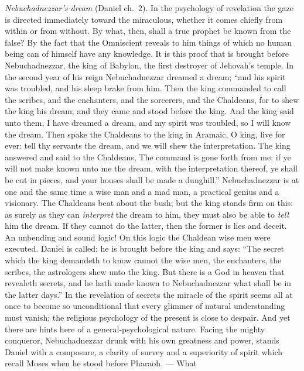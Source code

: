 \documentclass[12pt,a4paper,openany]{book}
\newcommand{\opage}[1]{\marginnote{\footnotesize\textit{[#1]}}}
\begin{document}
\emph{Nebuchadnezzar's dream} (Daniel ch.~2). In the psychology of revelation
the gaze is directed immediately toward
the miraculous, whether it comes chiefly from within
or from without. By what, then, shall a true prophet be
known from the false? By the fact that the
Omniscient reveals to him things of which no human being
can of himself have any knowledge. It is this proof
that is brought before Nebuchadnezzar, the king of Babylon,
the first destroyer of Jehovah's temple. In the second year of his reign
Nebuchadnezzar dreamed a dream; ``and his spirit
\setcounter{footnote}{0}%
\opage{42}was troubled, and his sleep brake from him. Then the king
commanded to call the scribes, and the enchanters, and
the sorcerers, and the Chaldeans, for to shew the king
his dream; and they came and stood before the king.
And the king said unto them, I have dreamed a dream, and
my spirit was troubled, so I will know the dream. Then spake the Chaldeans
to the king in Aramaic, O king, live
for ever: tell thy servants the dream, and we will shew
the interpretation. The king answered and said to the Chaldeans,
The command is gone forth from me: if ye will not
make known unto me the dream, with the interpretation thereof, ye
shall be cut in pieces, and your houses shall be made a
dunghill.'' Nebuchadnezzar is at one and the same time a wise
man and a mad man, a practical genius and a visionary.
The Chaldeans beat about the bush; but the king stands
firm on this: as surely as they can \emph{interpret} the dream to him,
they must also be able to \emph{tell} him the dream. If they cannot
do the latter, then the former is lies and deceit.
An unbending and sound logic! On this logic
the Chaldean wise men were executed. Daniel
is called; he is brought before the king and says: ``The secret
which the king demandeth to know cannot the wise men,
the enchanters, the scribes, the astrologers shew
unto the king. But there is a God in heaven that
revealeth secrets, and he hath made known to
Nebuchadnezzar what shall be in the latter days.'' In the
revelation of secrets the miracle of the spirit seems
all at once to become so unconditional that every glimmer of
natural understanding must vanish; the religious psychology of the present
is close to despair. And yet there are
hints here of a general-psychological nature. Facing the
mighty conqueror, Nebuchadnezzar drunk with his own greatness and power,
\setcounter{footnote}{0}%
\opage{43}stands Daniel with a composure, a clarity of survey
and a superiority of spirit which recall
Moses when he stood before Pharaoh. --- What
\end{document}

